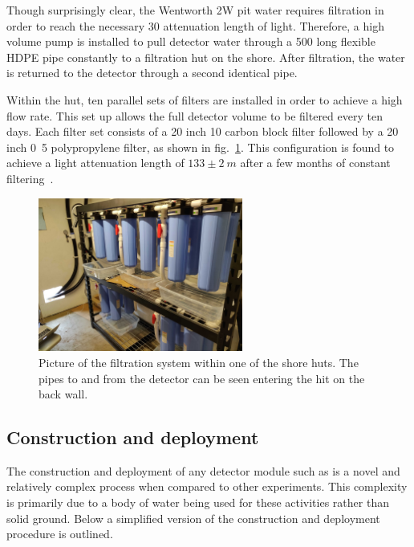 Though surprisingly clear, the Wentworth 2W pit water requires filtration in order to reach the
necessary \unit{30}{} attenuation length of light. Therefore, a high volume pump is
installed to pull detector water through a \unit{500}{} long flexible HDPE pipe
constantly to a filtration hut on the shore. After filtration, the water is returned to the
detector through a second identical pipe.

Within the hut, ten parallel sets of filters are installed in order to achieve a high flow rate.
This set up allows the full detector volume to be filtered every ten days. Each filter set
consists of a 20 inch \unit{10}{\mu{}} carbon block filter followed by a 20 inch
\unit{0.5}{\mu{}} polypropylene filter, as shown in fig.~\ref{fig:filtration}. This
configuration is found to achieve a light attenuation length of $133\pm2~m$ after a few months of
constant filtering~\cite{campbell2020}.

\begin{figure} %
    \includegraphics[width=0.6\textwidth]{diagrams/4-chips/filtration.jpg}
    \caption[Picture of the \chipsfive filtration system]
    {Picture of the \chipsfive filtration system within one of the shore huts. The pipes to and
        from the detector can be seen entering the hit on the back wall.}
    \label{fig:filtration}
\end{figure}

\subsection{Construction and deployment} %
\label{sec:chips_detector_deployment} %

The construction and deployment of any \chips detector module such as \chipsfive is a novel and
relatively complex process when compared to other experiments. This complexity is primarily due to
a body of water being used for these activities rather than solid ground. Below a simplified
version of the \chipsfive construction and deployment procedure is outlined.

